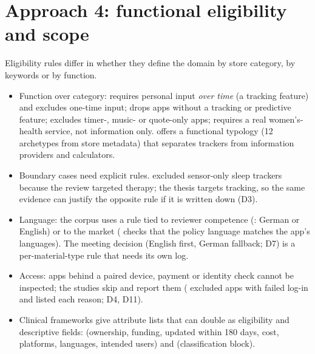 \section{Approach 4: functional eligibility and scope}
Eligibility rules differ in whether they define the domain by store category, by keywords or by function.
\begin{itemize}
\item Function over category:  requires personal input \emph{over time} (a tracking feature) and excludes one-time input;  drops apps without a tracking or predictive feature;  excludes timer-, music- or quote-only apps;  requires a real women's-health service, not information only.  offers a functional typology (12 archetypes from store metadata) that separates trackers from information providers and calculators.
\item Boundary cases need explicit rules.  excluded sensor-only sleep trackers because the review targeted therapy; the thesis targets tracking, so the same evidence can justify the opposite rule if it is written down (D3).
\item Language: the corpus uses a rule tied to reviewer competence (: German or English) or to the market ( checks that the policy language matches the app's languages). The meeting decision (English first, German fallback; D7) is a per-material-type rule that needs its own log.
\item Access: apps behind a paired device, payment or identity check cannot be inspected; the studies skip and report them ( excluded apps with failed log-in and listed each reason; D4, D11).
\item Clinical frameworks give attribute lists that can double as eligibility and descriptive fields:  (ownership, funding, updated within 180 days, cost, platforms, languages, intended users) and  (classification block).
\end{itemize}

